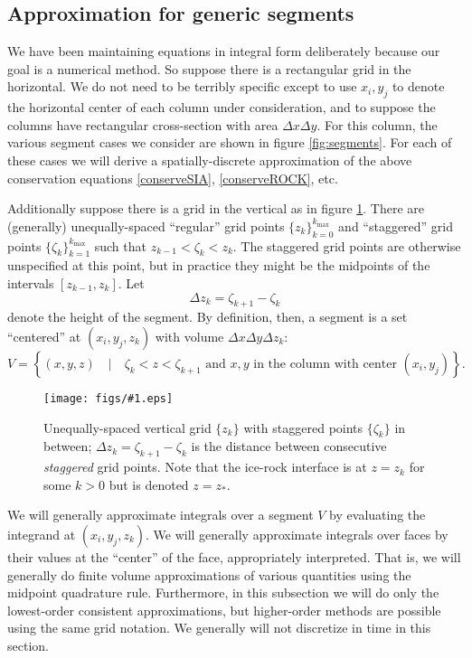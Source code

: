 \documentclass[12pt,final]{amsart}%
\theoremstyle{plain}
\theoremstyle{definition}
\theoremstyle{remark}
\newcommand{\regfigure}[2]{\texttt{[image: figs/\#1.eps]}}
\begin{document}
\subsection*{Approximation for generic segments}  We have been maintaining equations in integral form deliberately because our goal is a numerical method.  So suppose there is a rectangular grid in the horizontal.  We do not need to be terribly specific except to use $x_i,y_j$ to denote the horizontal center of each column under consideration, and to suppose the columns have rectangular cross-section with area $\Delta x\Delta y$.  For this column, the various segment cases we consider are shown in figure \ref{fig:segments}.  For each of these cases we will derive a spatially-discrete approximation of the above conservation equations \eqref{conserveSIA}, \eqref{conserveROCK}, etc.

Additionally suppose there is a grid in the vertical as in figure \ref{fig:verticalgrid}.  There are (generally) unequally-spaced ``regular'' grid points $\{z_k\}_{k=0}^{k_{\max}}$ and ``staggered'' grid points $\{\zeta_k\}_{k=1}^{k_{\max}}$ such that $z_{k-1} < \zeta_k < z_k$.  The staggered grid points are otherwise unspecified at this point, but in practice they might be the midpoints of the intervals $[z_{k-1},z_k]$.  Let
    $$\Delta z_k = \zeta_{k+1} - \zeta_k$$
denote the height of the segment.  By definition, then, a segment is a set ``centered'' at $(x_i,y_j, z_k)$ with volume $\Delta x \Delta y \Delta z_k$:
    $$V = \left\{(x,y,z) \quad\big|\quad \zeta_k < z < \zeta_{k+1} \text{ and } x, y \text{ in the column with center } (x_i,y_j) \right\}.$$

\begin{figure}[ht]
\vspace{0.2in}
\regfigure{verticalgrid}{4.0}
\vspace{0.2in}
\caption{Unequally-spaced vertical grid $\{z_k\}$ with staggered points $\{\zeta_k\}$ in between; $\Delta z_k= \zeta_{k+1} - \zeta_k$ is the distance between consecutive \emph{staggered} grid points.  Note that the ice-rock interface is at $z=z_k$ for some $k>0$ but is denoted $z=z_\ast$.}
\label{fig:verticalgrid}
\end{figure}

We will generally approximate integrals over a segment $V$ by evaluating the integrand at $(x_i,y_j, z_k)$.  We will generally approximate integrals over faces by their values at the ``center'' of the face, appropriately interpreted.  That is, we will generally do finite volume approximations of various quantities using the midpoint quadrature rule.  Furthermore, in this subsection we will do only the lowest-order consistent approximations, but higher-order methods are possible using the same grid notation.  We generally will not discretize in time in this section.
\end{document}
